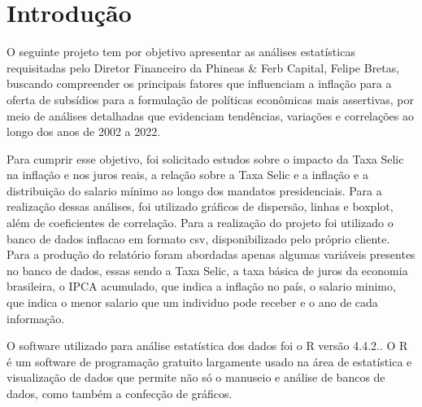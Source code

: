 \documentclass[
]{estat/estat}
\author{}
\date{}
\let\oldsection\section
\renewcommand\section{\clearpage\oldsection}
\renewcommand*\contentsname{Índice}
\newcommand\contentsname{Índice}
\begin{document}
\fancyhf{} 

\fancyhead[L]{} %
\renewcommand{\headrulewidth}{0pt}   %

\fancyfoot[R]{\textcolor{white}{\thepage}} %

\pagestyle{fancy} 



\renewcommand*\contentsname{Sumário}
{
\hypersetup{linkcolor=}
\setcounter{tocdepth}{3}
\tableofcontents
}

\section{Introdução}\label{introduuxe7uxe3o}

O seguinte projeto tem por objetivo apresentar as análises estatísticas
requisitadas pelo Diretor Financeiro da Phineas \& Ferb Capital, Felipe
Bretas, buscando compreender os principais fatores que influenciam a
inflação para a oferta de subsídios para a formulação de políticas
econômicas mais assertivas, por meio de análises detalhadas que
evidenciam tendências, variações e correlações ao longo dos anos de 2002
a 2022.

Para cumprir esse objetivo, foi solicitado estudos sobre o impacto da
Taxa Selic na inflação e nos juros reais, a relação sobre a Taxa Selic e
a inflação e a distribuição do salario mínimo ao longo dos mandatos
presidenciais. Para a realização dessas análises, foi utilizado gráficos
de dispersão, linhas e boxplot, além de coeficientes de correlação. Para
a realização do projeto foi utilizado o banco de dados inflacao em
formato csv, disponibilizado pelo próprio cliente. Para a produção do
relatório foram abordadas apenas algumas variáveis presentes no banco de
dados, essas sendo a Taxa Selic, a taxa básica de juros da economia
brasileira, o IPCA acumulado, que indica a inflação no país, o salario
minimo, que indica o menor salario que um individuo pode receber e o ano
de cada informação.

O software utilizado para análise estatística dos dados foi o R versão
4.4.2.. O R é um software de programação gratuito largamente usado na
área de estatística e visualização de dados que permite não só o
manuseio e análise de bancos de dados, como também a confecção de
gráficos.
\end{document}
